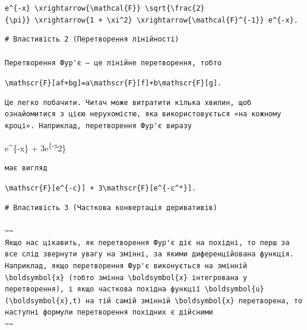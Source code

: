\documentclass[
  ukrainian,
]{article}
\begin{document}
\texttt{e\^{}\{-\textbar{}x\textbar{}\}\ \textbackslash{}xrightarrow\{\textbackslash{}mathcal\{F\}\}\ \textbackslash{}sqrt\{\textbackslash{}frac\{2\}\{\textbackslash{}pi\}\}\ \textbackslash{}xrightarrow\{1\ +\ \textbackslash{}xi\^{}2\}\ \textbackslash{}xrightarrow\{\textbackslash{}mathcal\{F\}\^{}\{-1\}\}\ e\^{}\{-\textbar{}x\textbar{}\}.}

\begin{verbatim}
# Властивість 2 (Перетворення лінійності)

Перетворення Фур'є — це лінійне перетворення, тобто
\end{verbatim}

\texttt{\textbackslash{}mathscr\{F\}{[}af+bg{]}=a\textbackslash{}mathscr\{F\}{[}f{]}+b\textbackslash{}mathscr\{F\}{[}g{]}.}

\begin{verbatim}
Це легко побачити. Читач може витратити кілька хвилин, щоб ознайомитися з цією нерухомістю, яка використовується «на кожному кроці». Наприклад, перетворення Фур'є виразу
\end{verbatim}

e\^{}\{-x\} + 3e\textsuperscript{\{-x}2\}

\begin{verbatim}
має вигляд
\end{verbatim}

\texttt{\textbackslash{}mathscr\{F\}{[}e\^{}\{-c\}{]}\ +\ 3\textbackslash{}mathscr\{F\}{[}e\^{}\{-c\^{}*\}{]}.}

\begin{verbatim}
# Властивість 3 (Часткова конвертація деривативів)

~~
Якщо нас цікавить, як перетворення Фур'є діє на похідні, то перш за все слід звернути увагу на змінні, за якими диференційована функція. Наприклад, якщо перетворення Фур'є виконується на змінній \boldsymbol{x} (тобто змінна \boldsymbol{x} інтегрована у перетворення), і якщо часткова похідна функції \boldsymbol{u}(\boldsymbol{x},t) на тій самій змінній \boldsymbol{x} перетворена, то наступні формули перетворення похідних є дійсними
~~
\end{verbatim}
\end{document}
